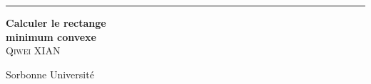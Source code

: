 \documentclass[14px]{article}
\begin{document}
\setlength{\parindent}{0pt}
\begin{titlepage}
	\thispagestyle{empty}
	\raggedleft 
	\rule{1pt}{\textheight} %
	\hspace{0.05\textwidth} %
	\parbox[b]{0.75\textwidth}{ %
		
		{\Huge\bfseries Calculer le rectange \\minimum convexe}\\[2\baselineskip] %
		{\Large\textsc{Qiwei XIAN}} %
		
		\vspace{0.5\textheight} %

		{\noindent Sorbonne Université}\\[\baselineskip] %
	}
\end{titlepage}
\clearpage

\tableofcontents
\thispagestyle{empty}
\clearpage

\pagestyle{fancy}	
\rhead{\thepage}
\fancyfoot{}
\end{document}
